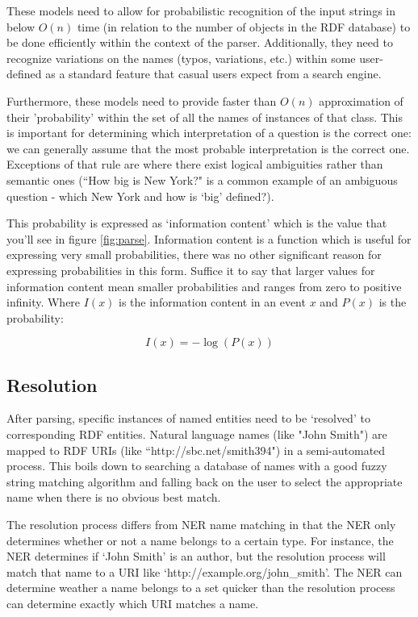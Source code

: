\documentclass[11pt]{article}
\begin{document}
These models need to allow for probabilistic recognition of the input strings in 
below $O(n)$ time (in relation to the number of objects in the RDF
database) to be done efficiently within the context of the parser. 
Additionally, they need to recognize variations on
the names (typos, variations, etc.) within some user-defined as a standard feature
that casual users expect from a search engine.

Furthermore, these models need to provide faster than $O(n)$
approximation of their 'probability' within the set of all the names of instances
of that class. This is important for determining which interpretation of a
question is the correct one: we can generally assume that the most probable
interpretation is the correct one. Exceptions of that rule are where there exist
logical ambiguities rather than semantic ones (``How big is New York?" is a common example
of an ambiguous question - which New York and how is `big' defined?). 

This probability is expressed as `information content'\cite{shannon} which is
the value that you'll see in figure \ref{fig:parse}. 
Information content is a function which is useful for expressing very small 
probabilities, there was no other significant reason for expressing
probabilities in this form. Suffice it to say that larger values for information content
mean smaller probabilities and ranges from zero to positive infinity. 
Where $I(x)$ is the information content in an event
$x$ and $P(x)$ is the probability:

\[ I(x) = -\log(P(x)) \]

\subsection{Resolution}
\label{resolution}
After parsing, specific instances of named entities need to be `resolved' to
corresponding RDF entities. Natural language names (like "John Smith") are mapped
to RDF URIs (like ``http://sbc.net/smith394")
in a semi-automated process. This boils down to searching a
database of names with a good fuzzy string matching algorithm and falling
back on the user to select the appropriate name when there is no obvious best 
match.

The resolution process differs from NER name matching in that the NER 
only determines whether or not a name belongs to a certain type. For instance, the NER
determines if `John Smith' is an author, but the resolution process will match that
name to a URI like `http://example.org/john\_smith'. The NER can determine weather
a name belongs to a set quicker than the resolution process can determine exactly
which URI matches a name.
\end{document}
